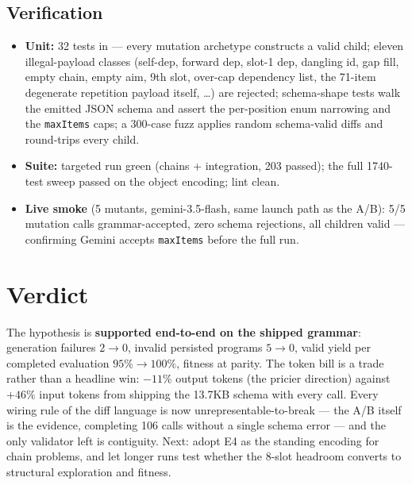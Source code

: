 \documentclass[11pt]{article}
\begin{document}
\subsection{Verification}
\begin{itemize}
  \item \textbf{Unit:} 32 tests in  --- every mutation
  archetype constructs a valid child; eleven illegal-payload classes (self-dep, forward dep,
  slot-1 dep, dangling id, gap fill, empty chain, empty aim, 9th slot, over-cap dependency
  list, the 71-item degenerate repetition payload itself, \dots) are rejected; schema-shape
  tests walk the emitted JSON schema and assert the per-position enum narrowing and the
  \texttt{maxItems} caps; a 300-case fuzz applies random schema-valid diffs and round-trips
  every child.
  \item \textbf{Suite:} targeted run green (chains + integration, 203 passed); the full
  1740-test sweep passed on the object encoding; lint clean.
  \item \textbf{Live smoke} (5 mutants, gemini-3.5-flash, same launch path as the A/B):
  5/5 mutation calls grammar-accepted, zero schema rejections, all children valid ---
  confirming Gemini accepts \texttt{maxItems} before the full run.
\end{itemize}

\section{Verdict}
The hypothesis is \textbf{supported end-to-end on the shipped grammar}: generation failures
$2\to0$, invalid persisted programs $5\to0$, valid yield per completed evaluation
$95\%\to100\%$, fitness at parity. The token bill is a trade rather than a headline win:
$-11\%$ output tokens (the pricier direction) against $+46\%$ input tokens from shipping
the 13.7KB schema with every call. Every wiring rule of the diff language is now
unrepresentable-to-break --- the A/B itself is the evidence, completing 106 calls without a
single schema error --- and the only validator left is contiguity. Next: adopt E4 as the
standing encoding for chain problems, and let longer runs test whether the 8-slot headroom
converts to structural exploration and fitness.
\end{document}
